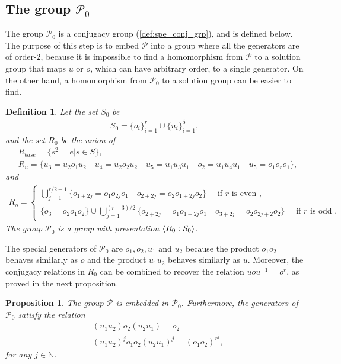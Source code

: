 \documentclass[11pt,letterpaper]{article}
\DeclarePairedDelimiter{\ip}{\langle}{\rangle}
\newcommand{\N}{\mathbb{N}}
\newcommand{\1}{\mathbb{1}}
\newcommand{\Pg}{\mathcal{P}}
\newtheorem{proposition}[theorem]{Proposition}
\newtheorem{definition}[theorem]{Definition}
\theoremstyle{definition}
\begin{document}
\subsection{The group $\Pg_0$}
\label{sec:g0}

The group $\Pg_0$ is a conjugacy group (\cref{def:spe_conj_grp}), and is defined below.
The purpose of this step is to embed $\Pg$ into a group where all the
generators are of order-$2$, because
it is impossible to find a homomorphism from $\Pg$ to a solution group that maps $u$ or $o$, which can have arbitrary order, to a single generator. On the other hand, 
a homomorphism from $\Pg_0$ to a solution group can be easier to find.
\begin{definition}	
\label{def:g0}
	Let the set $S_0$ be 
	\begin{align*}
		S_0 = \{o_i\}_{i=1}^{r} \cup \{u_i\}_{i=1}^5,
	\end{align*}
	and the set $R_0$ be the union of 
	\begin{align*}
	&R_{base} = \{s^2 = e | s \in S\},\\
	&R_{u} = \{ u_3 = u_2o_1u_2 \quad u_4 = u_2o_2u_2 \quad 
	u_5 = u_1u_3u_1 \quad o_2 = u_1u_4u_1 \quad u_5 = o_1 o_r o_1\},
	\end{align*}
	and 
	\begin{align*}
	R_o = 
	\begin{cases} 
	\bigcup_{j=1}^{r/2-1}\{ o_{1+2j} = o_1o_{2j}o_1 \quad o_{2+2j} = o_2o_{1+2j}o_2\} \quad \text{ if $r$ is even },\\
	\{o_3 = o_2o_1o_2\} \cup \bigcup_{j=1}^{(r-3)/2}\{
	 o_{2+2j} =o_1o_{1+2j}o_1 \quad o_{3+2j} = o_2o_{2j+2}o_2 \}\quad\text{ if $r$ is odd }.
	\end{cases}
	\end{align*}
	The group $\Pg_0$ is a group with presentation $\ip{R_0:S_0}$.
\end{definition}
The special generators of $\Pg_0$ are $o_1, o_2, u_1$ and $u_2$ because the product $o_1o_2$ behaves similarly as $o$
and the product $u_1u_2$ behaves similarly as $u$.
Moreover, the conjugacy relations in $R_0$ can be combined to recover the relation $uou^{-1} = o^r$,
as proved in the next proposition.
\begin{proposition}
    \label{prop:g0}
	The group $\Pg$ is embedded in $\Pg_0$.
	Furthermore, the generators of $\Pg_0$ satisfy the relation 
	\begin{align}
	    \label{eq:uo_comm}
	    &(u_1u_2) o_2 (u_2u_1) = o_2 \\ 
	    \label{eq:uo_rel}
		&(u_1u_2)^j o_1o_2 (u_2u_1)^j = (o_1o_2)^{r^j}, 
	\end{align}
	for any $ j \in \N$.
\end{proposition}
\end{document}
